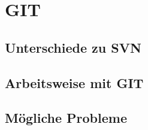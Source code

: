 \section{GIT}

\subsection{Unterschiede zu SVN}

\subsection{Arbeitsweise mit GIT}

\subsection{Mögliche Probleme}

